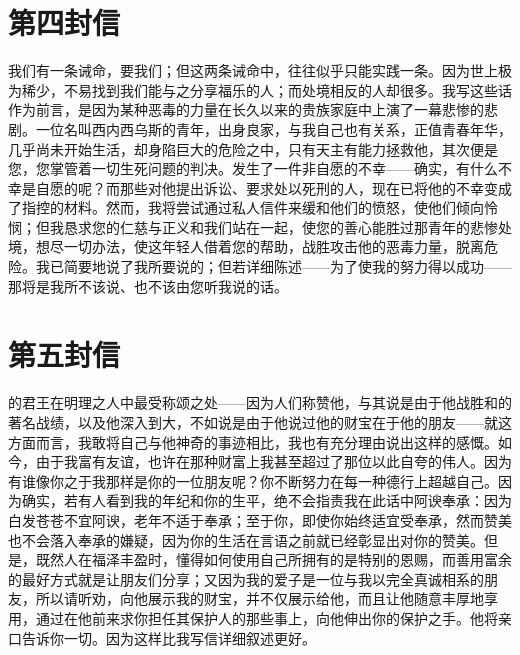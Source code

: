 
\section{第四封信}

\par

\par

我们有一条诫命，要我们；但这两条诫命中，往往似乎只能实践一条。因为世上极为稀少，不易找到我们能与之分享福乐的人；而处境相反的人却很多。我写这些话作为前言，是因为某种恶毒的力量在长久以来的贵族家庭中上演了一幕悲惨的悲剧。一位名叫西内西乌斯的青年，出身良家，与我自己也有关系，正值青春年华，几乎尚未开始生活，却身陷巨大的危险之中，只有天主有能力拯救他，其次便是您，您掌管着一切生死问题的判决。发生了一件非自愿的不幸——确实，有什么不幸是自愿的呢？而那些对他提出诉讼、要求处以死刑的人，现在已将他的不幸变成了指控的材料。然而，我将尝试通过私人信件来缓和他们的愤怒，使他们倾向怜悯；但我恳求您的仁慈与正义和我们站在一起，使您的善心能胜过那青年的悲惨处境，想尽一切办法，使这年轻人借着您的帮助，战胜攻击他的恶毒力量，脱离危险。我已简要地说了我所要说的；但若详细陈述——为了使我的努力得以成功——那将是我所不该说、也不该由您听我说的话。\par



\section{第五封信}

\par

\par

的君王在明理之人中最受称颂之处——因为人们称赞他，与其说是由于他战胜和的著名战绩，以及他深入到大，不如说是由于他说过他的财宝在于他的朋友——就这方面而言，我敢将自己与他神奇的事迹相比，我也有充分理由说出这样的感慨。如今，由于我富有友谊，也许在那种财富上我甚至超过了那位以此自夸的伟人。因为有谁像你之于我那样是你的一位朋友呢？你不断努力在每一种德行上超越自己。因为确实，若有人看到我的年纪和你的生平，绝不会指责我在此话中阿谀奉承：因为白发苍苍不宜阿谀，老年不适于奉承；至于你，即使你始终适宜受奉承，然而赞美也不会落入奉承的嫌疑，因为你的生活在言语之前就已经彰显出对你的赞美。但是，既然人在福泽丰盈时，懂得如何使用自己所拥有的是特别的恩赐，而善用富余的最好方式就是让朋友们分享；又因为我的爱子是一位与我以完全真诚相系的朋友，所以请听劝，向他展示我的财宝，并不仅展示给他，而且让他随意丰厚地享用，通过在他前来求你担任其保护人的那些事上，向他伸出你的保护之手。他将亲口告诉你一切。因为这样比我写信详细叙述更好。\par

